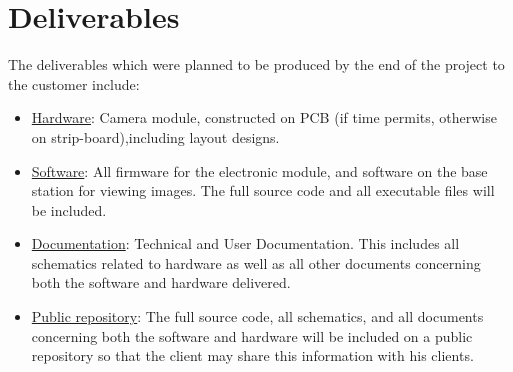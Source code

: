 \section{Deliverables}
The deliverables which were planned to be produced by the end of the project to the customer include:
\begin{itemize}
	\item \underline{Hardware}: Camera module, constructed on PCB (if time permits, otherwise on strip-board),including layout designs.
	\item \underline{Software}: All firmware for the electronic module, and software on the base station for viewing images. The full source code and all executable files will be included.
	\item \underline{Documentation}: Technical and User Documentation. This includes all schematics related to hardware as well as all other documents concerning both the software and hardware delivered.
	\item \underline{Public repository}: The full source code, all schematics, and all documents concerning both the software and hardware will be included on a public repository so that the client may share this information with his clients.
\end{itemize}
